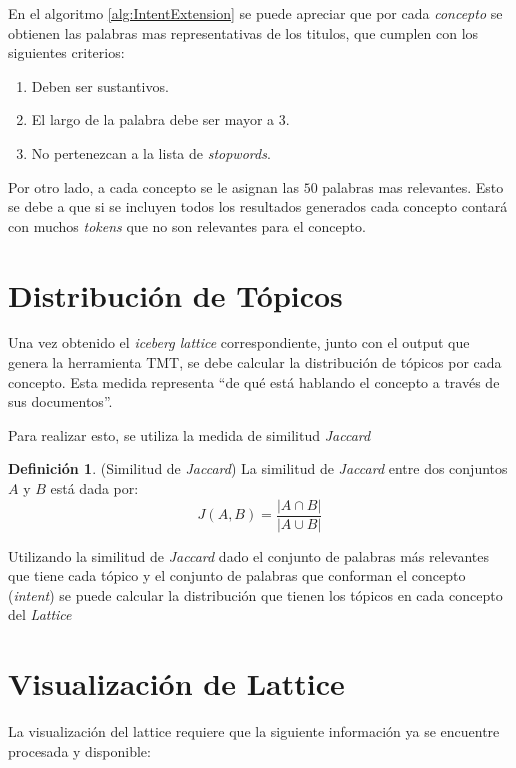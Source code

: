 \documentclass[12pt,oneside,letterpaper]{book}
\newcommand{\eng}[1]{\textit{#1}\xspace}			%
\newcommand{\abr}[1]{\textsc{#1}\xspace}           %
\theoremstyle{definition}
\newtheorem{definition}{Definición}[section]
\begin{document}
En el algoritmo \ref{alg:IntentExtension} se puede apreciar que por cada \emph{concepto} se obtienen las palabras mas representativas de los titulos, que cumplen con los siguientes criterios:

\begin{enumerate}
	\item Deben ser sustantivos.
	\item El largo de la palabra debe ser mayor a 3.	
	\item No pertenezcan a la lista de \eng{stopwords}.
\end{enumerate}

Por otro lado, a cada concepto se le asignan las $50$ palabras mas relevantes. Esto se debe a que si se incluyen todos los resultados generados cada concepto contará con muchos \eng{tokens} que no son relevantes para el concepto.


\section{Distribución de Tópicos}
\label{sec:distribucion_de_topicos}
Una vez obtenido el \eng{iceberg lattice} correspondiente, junto con el output que genera la herramienta \abr{TMT}, se debe calcular la distribución de tópicos por cada concepto. Esta medida representa ``de qué está hablando el concepto a través de sus documentos''.

Para realizar esto, se utiliza la medida de similitud \eng{Jaccard}

 \begin{definition}{(Similitud de \eng{Jaccard})}
 La similitud de \eng{Jaccard} entre dos conjuntos $A$ y $B$ está dada por:
 \begin{equation*}
	J(A,B) = \frac{\left\vert{A \cap B}\right\vert}{\left\vert{A \cup B}\right\vert}
\end{equation*}
 \end{definition}

 Utilizando la similitud de \eng{Jaccard} dado el conjunto de palabras más relevantes que tiene cada tópico y el conjunto de palabras que conforman el concepto (\eng{intent}) se puede calcular la distribución que tienen los tópicos en cada concepto del \eng{Lattice}

\section{Visualización de Lattice}
\label{sec:visualizacion_de_lattice}
La visualización del lattice requiere que la siguiente información ya se encuentre procesada y disponible:
\end{document}
